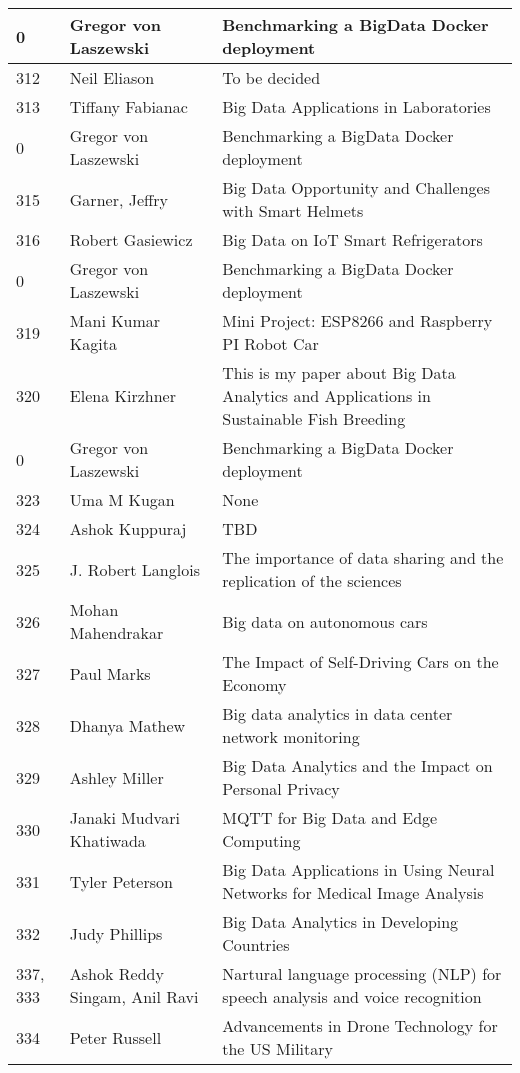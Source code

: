 \documentclass[12pt]{book}
\begin{document}
\begin{footnotesize}
\begin{longtable}{|p{1cm}p{5cm}p{9cm}|}
\hline
0 & Gregor von Laszewski & Benchmarking a BigData Docker deployment  \\
\hline
312 & Neil Eliason & To be decided  \\
\hline
313 & Tiffany Fabianac & Big Data Applications in Laboratories  \\
\hline
0 & Gregor von Laszewski & Benchmarking a BigData Docker deployment  \\
\hline
315 & Garner, Jeffry & Big Data Opportunity and Challenges with Smart Helmets  \\
\hline
316 & Robert Gasiewicz & Big Data on IoT Smart Refrigerators  \\
\hline
0 & Gregor von Laszewski & Benchmarking a BigData Docker deployment  \\
\hline
319 & Mani Kumar Kagita & Mini Project: ESP8266 and Raspberry PI Robot Car  \\
\hline
320 & Elena Kirzhner & This is my paper about Big Data Analytics and Applications in Sustainable Fish Breeding  \\
\hline
0 & Gregor von Laszewski & Benchmarking a BigData Docker deployment  \\
\hline
323 & Uma M Kugan & None  \\
\hline
324 & Ashok Kuppuraj & TBD  \\
\hline
325 & J. Robert Langlois & The importance of data sharing and the replication of the sciences  \\
\hline
326 & Mohan Mahendrakar & Big data on autonomous cars  \\
\hline
327 & Paul Marks & The Impact of Self-Driving Cars on the Economy  \\
\hline
328 & Dhanya Mathew & Big data analytics in data center network monitoring  \\
\hline
329 & Ashley Miller & Big Data Analytics and the Impact on Personal Privacy  \\
\hline
330 & Janaki Mudvari Khatiwada & MQTT for Big Data and Edge Computing  \\
\hline
331 & Tyler Peterson & Big Data Applications in Using Neural Networks for Medical Image Analysis  \\
\hline
332 & Judy Phillips & Big Data Analytics in Developing Countries  \\
\hline
337, 333 & Ashok Reddy Singam, Anil Ravi & Nartural language processing (NLP) for speech analysis and voice recognition  \\
\hline
334 & Peter Russell & Advancements in Drone Technology for the US Military  \\

\end{longtable}
\end{footnotesize}
\end{document}

